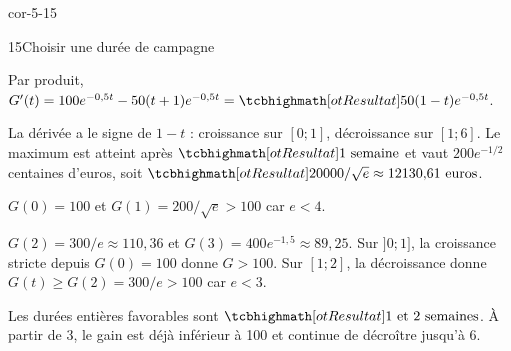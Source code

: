 \begin{blocLivre}{cor-5-15}
\begin{corrige}{15}{Choisir une durée de campagne}
\begin{questions}
\item Par produit, $G'(t)=100e^{-0{,}5t}-50(t+1)e^{-0{,}5t}
=\res{50(1-t)e^{-0{,}5t}}$.
\item La dérivée a le signe de $1-t$ : croissance sur $[0;1]$, décroissance sur $[1;6]$.
Le maximum est atteint après $\res{1\text{ semaine}}$ et vaut
$200e^{-1/2}$ centaines d'euros, soit $\res{20000/\sqrt e\approx12130{,}61\text{ euros}}$.
\item $G(0)=100$ et $G(1)=200/\sqrt e>100$ car $e<4$.
\item $G(2)=300/e\approx110{,}36$ et $G(3)=400e^{-1{,}5}\approx89{,}25$.
Sur $]0;1]$, la croissance stricte depuis $G(0)=100$ donne $G>100$.
Sur $[1;2]$, la décroissance donne $G(t)\geq G(2)=300/e>100$ car $e<3$.
\item Les durées entières favorables sont $\res{1\text{ et }2\text{ semaines}}$.
À partir de 3, le gain est déjà inférieur à 100 et continue de décroître jusqu'à 6.
\end{questions}
\label{figlivre-r05-15-var-cor}

\label{figlivre-r05-15-campagne-cor}

\end{corrige}
\end{blocLivre}
